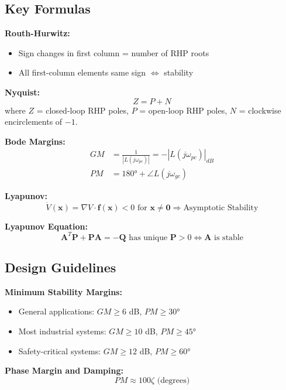 \subsection{Key Formulas}

\textbf{Routh-Hurwitz:}
\begin{itemize}
    \item Sign changes in first column = number of RHP roots
    \item All first-column elements same sign $\Leftrightarrow$ stability
\end{itemize}

\textbf{Nyquist:}
\begin{equation}
Z = P + N
\end{equation}
where $Z$ = closed-loop RHP poles, $P$ = open-loop RHP poles, $N$ = clockwise encirclements of $-1$.

\textbf{Bode Margins:}
\begin{align}
GM &= \frac{1}{|L(j\omega_{pc})|} = -|L(j\omega_{pc})|_{dB} \\
PM &= 180° + \angle L(j\omega_{gc})
\end{align}

\textbf{Lyapunov:}
\begin{equation}
\dot{V}(\mathbf{x}) = \nabla V \cdot \mathbf{f}(\mathbf{x}) < 0 \text{ for } \mathbf{x} \neq \mathbf{0} \Rightarrow \text{Asymptotic Stability}
\end{equation}

\textbf{Lyapunov Equation:}
\begin{equation}
\mathbf{A}^T\mathbf{P} + \mathbf{P}\mathbf{A} = -\mathbf{Q} \text{ has unique } \mathbf{P} > 0 \Leftrightarrow \mathbf{A} \text{ is stable}
\end{equation}

\subsection{Design Guidelines}

\textbf{Minimum Stability Margins:}
\begin{itemize}
    \item General applications: $GM \geq 6$ dB, $PM \geq 30°$
    \item Most industrial systems: $GM \geq 10$ dB, $PM \geq 45°$
    \item Safety-critical systems: $GM \geq 12$ dB, $PM \geq 60°$
\end{itemize}

\textbf{Phase Margin and Damping:}
\begin{equation}
PM \approx 100\zeta \text{ (degrees)}
\end{equation}

